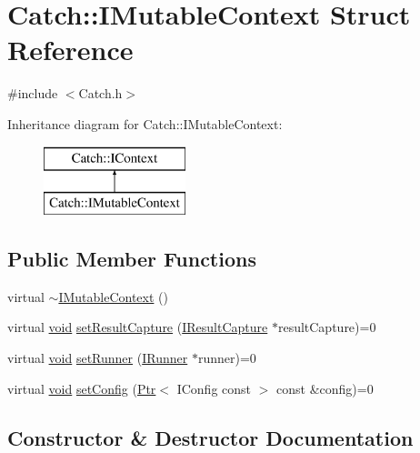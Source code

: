 \hypertarget{struct_catch_1_1_i_mutable_context}{}\section{Catch\+:\+:I\+Mutable\+Context Struct Reference}
\label{struct_catch_1_1_i_mutable_context}


{\ttfamily \#include $<$Catch.\+h$>$}

Inheritance diagram for Catch\+:\+:I\+Mutable\+Context\+:\begin{figure}[H]
\begin{center}
\leavevmode
\includegraphics[height=2.000000cm]{struct_catch_1_1_i_mutable_context}
\end{center}
\end{figure}
\subsection*{Public Member Functions}
\begin{DoxyCompactItemize}
\item 
virtual \hyperlink{struct_catch_1_1_i_mutable_context_a93f32b2ab6d0fb83637059240be799ab}{$\sim$\+I\+Mutable\+Context} ()
\item 
virtual \hyperlink{_s_d_l__opengles2__gl2ext_8h_ae5d8fa23ad07c48bb609509eae494c95}{void} \hyperlink{struct_catch_1_1_i_mutable_context_a4a80afd0525b7def21bee8d9b48f2d39}{set\+Result\+Capture} (\hyperlink{struct_catch_1_1_i_result_capture}{I\+Result\+Capture} $\ast$result\+Capture)=0
\item 
virtual \hyperlink{_s_d_l__opengles2__gl2ext_8h_ae5d8fa23ad07c48bb609509eae494c95}{void} \hyperlink{struct_catch_1_1_i_mutable_context_af2e53b1dea4527a2587cff266a730f6e}{set\+Runner} (\hyperlink{struct_catch_1_1_i_runner}{I\+Runner} $\ast$runner)=0
\item 
virtual \hyperlink{_s_d_l__opengles2__gl2ext_8h_ae5d8fa23ad07c48bb609509eae494c95}{void} \hyperlink{struct_catch_1_1_i_mutable_context_a04ae4f4219a481a7bf658d9fd445bc1d}{set\+Config} (\hyperlink{class_catch_1_1_ptr}{Ptr}$<$ I\+Config const  $>$ const \&config)=0
\end{DoxyCompactItemize}


\subsection{Constructor \& Destructor Documentation}
